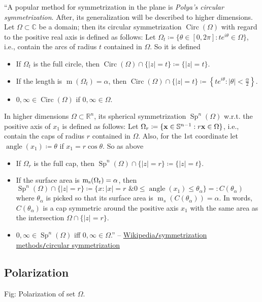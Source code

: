 \documentclass[oneside]{book}
\numberwithin{equation}{section}
\begin{document}
``A popular method for symmetrization in the plane is \textit{Polya's circular symmetrization}. After, its generalization will be described to higher dimensions. Let $\Omega\subset\mathbb{C}$ be a domain; then its circular symmetrization $\operatorname{Circ}(\Omega)$ with regard to the positive real axis is defined as follows: Let $\Omega_t\coloneqq\{\theta\in[0,2\pi]:te^{i\theta}\in\Omega\}$, i.e., contain the arcs of radius $t$ contained in $\Omega$. So it is defined
\begin{itemize}
	\item If $\Omega_t$ is the full circle, then $\operatorname{Circ}(\Omega)\cap\{|z| = t\}\coloneqq\{|z| = t\}$.
	\item If the length is $\operatorname{m}(\Omega_t) = \alpha$, then $\operatorname{Circ}(\Omega)\cap\{|z| = t\}\coloneqq\left\{te^{i\theta}:|\theta| < \frac{\alpha}{2}\right\}$.
	\item $0,\infty\in\operatorname{Circ}(\Omega)$ if $0,\infty\in\Omega$.
\end{itemize}
In higher dimensions $\Omega\subset\mathbb{R}^n$, its spherical symmetrization $\operatorname{Sp}^n(\Omega)$ w.r.t. the positive axis of $x_1$ is defined as follows: Let $\Omega_r\coloneqq\{{\bf x}\in\mathbb{S}^{n-1}:r{\bf x}\in\Omega\}$, i.e., contain the caps of radius $r$ contained in $\Omega$. Also, for the 1st coordinate let $\operatorname{angle}(x_1)\coloneqq\theta$ if $x_1 = r\cos\theta$. So as above
\begin{itemize}
	\item If $\Omega_r$ is the full cap, then $\operatorname{Sp}^n(\Omega)\cap\{|z| = r\}\coloneqq\{|z| = t\}$.
	\item If the surface area is $\operatorname{m}_{\rm s}(\Omega_t) = \alpha$, then $\operatorname{Sp}^n(\Omega)\cap\{|z| = r\}\coloneqq\{x:|x| = r\mbox{ \& }0\le\operatorname{angle}(x_1)\le\theta_\alpha\}=:C(\theta_\alpha)$ where $\theta_\alpha$ is picked so that its surface area is $\operatorname{m}_s(C(\theta_\alpha)) = \alpha$. In words, $C(\theta_\alpha)$ is a cap symmetric around the positive axis $x_1$ with the same area as the intersection $\Omega\cap\{|z| = r\}$.
	\item $0,\infty\in\operatorname{Sp}^n(\Omega)$ iff $0,\infty\in\Omega$.'' -- \href{https://en.wikipedia.org/wiki/Symmetrization_methods#Circular_symmetrization}{Wikipedia\texttt{/}symmetrization methods\texttt{/}circular symmetrization}
\end{itemize}

\subsection{Polarization}
\textsf{Fig: Polarization of set $\Omega$.}
\end{document}
